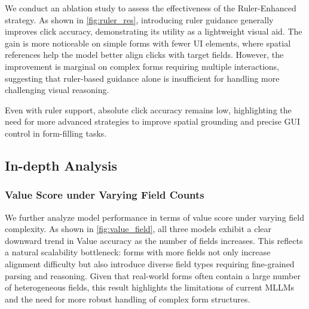 \documentclass[sigconf, screen, review]{acmart}
\newcommand{\bobo}[1]{%
  \begin{CJK}{UTF8}{gbsn} %
  {\color{cyan}Bobo: #1}%
  \end{CJK}%
}
\begin{document}
We conduct an ablation study to assess the effectiveness of the Ruler-Enhanced strategy.
As shown in \cref{fig:ruler_res}, introducing ruler guidance generally improves click accuracy, demonstrating its utility as a lightweight visual aid. The gain is more noticeable on simple forms with fewer UI elements, where spatial references help the model better align clicks with target fields. However, the improvement is marginal on complex forms requiring multiple interactions, suggesting that ruler-based guidance alone is insufficient for handling more challenging visual reasoning.

Even with ruler support, absolute click accuracy remains low, highlighting the need for more advanced strategies to improve spatial grounding and precise GUI control in form-filling tasks.


\subsection{In-depth Analysis}
\subsubsection{Value Score under Varying Field Counts}
We further analyze model performance in terms of value score under varying field complexity. As shown in \cref{fig:value_field}, all three models exhibit a clear downward trend in Value accuracy as the number of fields increases.
This reflects a natural scalability bottleneck: forms with more fields not only increase alignment difficulty but also introduce diverse field types requiring fine-grained parsing and reasoning.
Given that real-world forms often contain a large number of heterogeneous fields, this result highlights the limitations of current MLLMs and the need for more robust handling of complex form structures.
\end{document}
